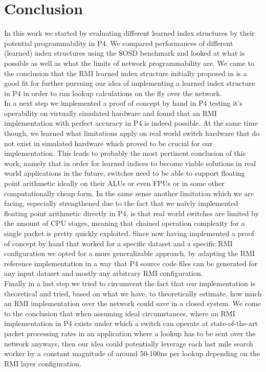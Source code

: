 
\chapter{Conclusion}
\label{ch:conclusion}
In this work we started by evaluating different learned index structures by their potential programmability in P4. We compared performances of different (learned) index structures using the SOSD benchmark \cite{sosd-neurips} and looked at what is possible as well as what the limits of network programmability are. We came to the conclusion that the RMI learned index structure initially proposed in \cite{rmi} is a good fit for further pursuing our idea of implementing a learned index structure in P4 in order to run lookup calculations on the fly over the network.\\

In a next step we implemented a proof of concept by hand in P4 testing it's operability on virtually simulated hardware and found that an RMI implementation with perfect accuracy in P4 is indeed possible. At the same time though, we learned what limitations apply on real world switch hardware that do not exist in simulated hardware which proved to be crucial for our implementation. This leads to probably the most pertinent conclusion of this work, namely that in order for learned indices to become viable solutions in real world applications in the future, switches need to be able to support floating point arithmetic ideally on their ALUs or even FPUs or in some other computationally cheap form. In the same sense another limitation which we are facing, especially strengthened due to the fact that we naïvly implemented floating point arithmetic directly in P4, is that real world switches are limited by the amount of CPU stages, meaning that chained operation complexity for a single packet is pretty quickly exploited. Since now having implemented a proof of concept by hand that worked for a specific dataset and a specific RMI configuration we opted for a more generalizable approach, by adapting the RMI reference implementation \cite{cdfshop} in a way that P4 source code files can be generated for any input dataset and mostly any arbitrary RMI configuration.\\

Finally in a last step we tried to circumvent the fact that our implementation is theoretical and tried, based on what we have, to theoretically estimate, how much an RMI implementation over the network could save in a closed system. We come to the conclusion that when assuming ideal circumstances, where an RMI implementation in P4 exists under which a switch can operate at state-of-the-art packet processing rates in an application where a lookup has to be sent over the network anyways, then our idea could potentially leverage each last mile search worker by a constant magnitude of around 50-100ns per lookup depending on the RMI layer configuration.


